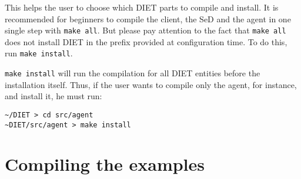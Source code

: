 This helps the user to choose which DIET parts to compile and
install. It is recommended for beginners to compile the client,
the SeD and the agent in one single step with \texttt{make all}. But
please pay attention to the fact that \texttt{make all} does not
install DIET in the prefix provided at configuration time. To do this,
run \texttt{make install}.

\texttt{make install} will run the compilation for all DIET entities
before the installation itself. Thus, if the user wants to compile
only the agent, for instance, and install it, he must run:
{\footnotesize
\begin{verbatim}
~/DIET > cd src/agent
~DIET/src/agent > make install
\end{verbatim}
}


\section{Compiling the examples}

